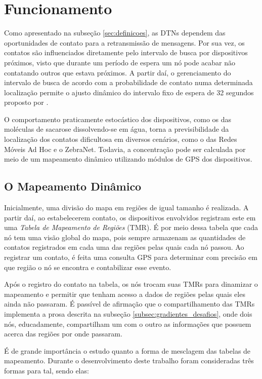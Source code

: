 \section{Funcionamento}

Como apresentado na subseção \ref{sec:definicoes}, as DTNs dependem das oportunidades de contato para a retransmissão de mensagens. Por sua vez, os contatos são influenciados diretamente pelo intervalo de busca por dispositivos próximos, visto que durante um período de espera um nó pode acabar não contatando outros que estava próximos. A partir daí, o gerenciamento do intervalo de busca de acordo com a probabilidade de contato numa determinada localização permite o ajusto dinâmico do intervalo fixo de espera de 32 segundos proposto por \cite{denis_artigo}.

O comportamento praticamente estocástico dos dispositivos, como os das moléculas de sacarose dissolvendo-se em água, torna a previsibilidade da localização dos contatos dificultosa em diversos cenários, como o das Redes Móveis Ad Hoc e o ZebraNet. Todavia, a concentração pode ser calculada por meio de um mapeamento dinâmico utilizando módulos de GPS dos dispositivos.

\subsection{O Mapeamento Dinâmico}

Inicialmente, uma divisão do mapa em regiões de igual tamanho é realizada. A partir daí, ao estabelecerem contato, os dispositivos envolvidos registram este em uma \emph{Tabela de Mapeamento de Regiões} (TMR). É por meio dessa tabela que cada nó tem uma visão global do mapa, pois sempre armazenam as quantidades de contatos registrados em cada uma das regiões pelas quais cada nó passou. Ao registrar um contato, é feita uma consulta GPS para determinar com precisão em que região o nó se encontra e contabilizar esse evento.

Após o registro do contato na tabela, os nós trocam suas TMRs para dinamizar o mapeamento e permitir que tenham acesso a dados de regiões pelas quais eles ainda não passaram. É passível de afirmação que o compartilhamento das TMRs implementa a prosa descrita na subseção \ref{subsec:gradientes_desafios}, onde dois nós, educadamente, compartilham um com o outro as informações que possuem acerca das regiões por onde passaram.

É de grande importância o estudo quanto a forma de mesclagem das tabelas de mapeamento. Durante o desenvolvimento deste trabalho foram consideradas três formas para tal, sendo elas:

